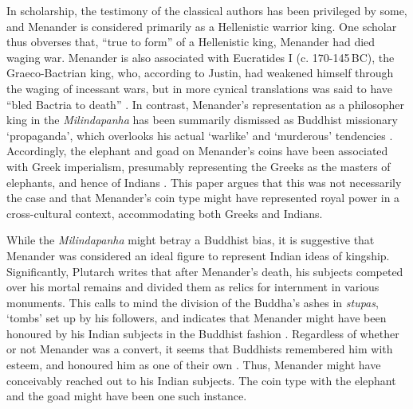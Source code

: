 \documentclass{ijsra}
\renewcommand\BC{{\,BC\xspace}}
\begin{document}
In scholarship, the testimony of the classical authors has been privileged by some, and Menander is considered primarily as a Hellenistic warrior king. One scholar thus obverses that, “true to form” of a Hellenistic king, Menander had died waging war.
Menander is also associated with Eucratides I (c. 170-145\BC),
the Graeco-Bactrian king, who, according to Justin,
had weakened himself through the waging of incessant wars,
but in more cynical translations was said to have “bled Bactria to death”
\parencites[128]{Holt2005}[156]{Mairs2014}[]{Justin. Ep. 41.6}[270]{Tarn1951}.
In contrast, Menander’s representation as a philosopher king in the \emph{Milindapanha} has been summarily dismissed as Buddhist missionary ‘propaganda’, which overlooks his actual ‘warlike’ and ‘murderous’ tendencies \parencites[234]{Widemann2000}[15--16]{Widemann2007}.
Accordingly, the elephant and goad on Menander’s coins have been associated with Greek imperialism, presumably representing the Greeks as the masters of elephants, and hence of Indians \parencite[87--89]{Fussman1993}.
This paper argues that this was not necessarily the case and that Menander’s coin type might have represented royal power in a cross-cultural context, accommodating both Greeks and Indians.

While the \emph{Milindapanha} might betray a Buddhist bias, it is suggestive that Menander was considered an ideal figure to represent Indian ideas of kingship.
Significantly, Plutarch writes that after Menander’s death, his subjects competed over his mortal remains and divided them as relics for internment in various monuments.
This calls to mind the division of the Buddha’s ashes in \emph{stupas}, ‘tombs’ set up by his followers, and indicates that Menander might have been honoured by his Indian subjects in the Buddhist fashion \parencites[]{Plut. Mor. 821d}[145]{Rothkrug2006}.
Regardless of whether or not Menander was a convert, it seems that Buddhists remembered him with esteem, and honoured him as one of their own \parencite[644]{Mairs2015}.
Thus, Menander might have conceivably reached out to his Indian subjects. The coin type with the elephant and the goad might have been one such instance.
\end{document}
